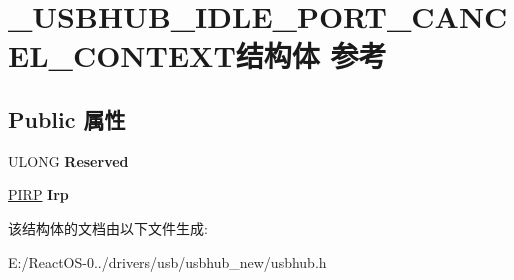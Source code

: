 \hypertarget{struct___u_s_b_h_u_b___i_d_l_e___p_o_r_t___c_a_n_c_e_l___c_o_n_t_e_x_t}{}\section{\+\_\+\+U\+S\+B\+H\+U\+B\+\_\+\+I\+D\+L\+E\+\_\+\+P\+O\+R\+T\+\_\+\+C\+A\+N\+C\+E\+L\+\_\+\+C\+O\+N\+T\+E\+X\+T结构体 参考}
\label{struct___u_s_b_h_u_b___i_d_l_e___p_o_r_t___c_a_n_c_e_l___c_o_n_t_e_x_t}
\subsection*{Public 属性}
\begin{DoxyCompactItemize}
\item 
\mbox{\label{struct___u_s_b_h_u_b___i_d_l_e___p_o_r_t___c_a_n_c_e_l___c_o_n_t_e_x_t_aa9eaad4fe84b4c91de424c3b8591eca1}} 
U\+L\+O\+NG {\bfseries Reserved}
\item 
\mbox{\label{struct___u_s_b_h_u_b___i_d_l_e___p_o_r_t___c_a_n_c_e_l___c_o_n_t_e_x_t_ad64359c72e417a46310bd0cad06a16e6}} 
\hyperlink{interfacevoid}{P\+I\+RP} {\bfseries Irp}
\end{DoxyCompactItemize}


该结构体的文档由以下文件生成\+:\begin{DoxyCompactItemize}
\item 
E\+:/\+React\+O\+S-\/0../drivers/usb/usbhub\+\_\+new/usbhub.\+h\end{DoxyCompactItemize}
